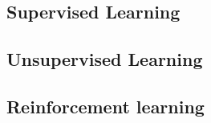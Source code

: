 \subsection{Supervised Learning}

\subsection{Unsupervised Learning}

\subsection{Reinforcement learning}

